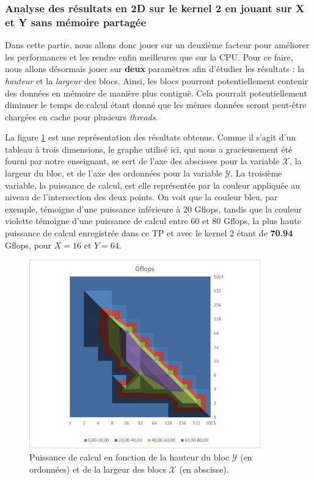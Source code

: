 \documentclass[	DIV=calc,%
							paper=a4,%
							fontsize=11pt%
							]{scrartcl}	 					%
\begin{document}
\subsubsection{Analyse des résultats en 2D sur le kernel 2 en jouant sur X et Y sans mémoire partagée}
Dans cette partie, nous allons donc jouer sur un deuxième facteur pour améliorer les performances et les rendre enfin meilleures que sur la CPU. Pour ce faire, nous allons désormais jouer sur \textbf{deux} paramètres afin d'étudier les résultats : la \textit{hauteur} et la \textit{largeur} des blocs. Ainsi, les blocs pourront potentiellement contenir des données en mémoire de manière plus contiguë. Cela pourrait potentiellement diminuer le temps de calcul étant donné que les mêmes données seront peut-être chargées en cache pour plusieurs \textit{threads}.\par
La figure \ref{fig:2DK2_power} est une représentation des résultats obtenus. Comme il s'agit d'un tableau à trois dimensions, le graphe utilisé ici, qui nous a gracieusement été fourni par notre enseignant, se sert de l'axe des abscisses pour la variable $\mathcal{X}$, la largeur du bloc, et de l'axe des ordonnées pour la variable $\mathcal{Y}$. La troisième variable, la puissance de calcul, est elle représentée par la couleur appliquée au niveau de l'intersection des deux points. On voit que la couleur bleu, par exemple, témoigne d'une puissance inférieure à 20 Gflops, tandis que la couleur violette témoigne d'une puissance de calcul entre 60 et 80 Gflops, la plus haute puissance de calcul enregistrée dans ce TP et avec le kernel 2 étant de \textbf{70.94} Gflops, pour $ X = 16 $ et $Y = 64$.\par
\begin{figure} 
      \includegraphics[keepaspectratio,width=10cm]{img/Gflops_depending_bloc_size.png}
	  \caption{Puissance de calcul en fonction de la hauteur du bloc $\mathcal{Y}$ (en ordonnées) et de la largeur des blocs $\mathcal{X}$ (en abscisse).}
      \label{fig:2DK2_power}
\end{figure} 
\end{document}
